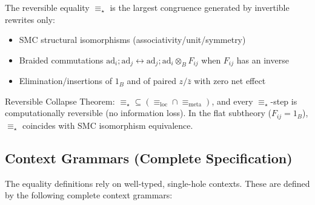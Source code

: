 \begin{definition}
\label{def:reversible-equality}
The reversible equality $\equiv_\star$ is the largest congruence generated by invertible rewrites only:
\begin{itemize}
\item SMC structural isomorphisms (associativity/unit/symmetry)
\item Braided commutations $\text{ad}_i; \text{ad}_j \leftrightarrow \text{ad}_j; \text{ad}_i \otimes_B F_{ij}$ when $F_{ij}$ has an inverse
\item Elimination/insertions of $1_B$ and of paired $z/\bar{z}$ with zero net effect
\end{itemize}

Reversible Collapse Theorem: $\equiv_\star \subseteq (\equiv_{\text{loc}} \cap \equiv_{\text{meta}})$, and every $\equiv_\star$-step is computationally reversible (no information loss). In the flat subtheory ($F_{ij} = 1_B$), $\equiv_\star$ coincides with SMC isomorphism equivalence.
\end{definition}

\subsection{Context Grammars (Complete Specification)}

The equality definitions rely on well-typed, single-hole contexts. These are defined by the following complete context grammars:

